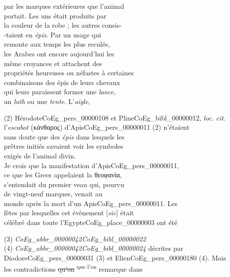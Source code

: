 \documentclass{book}
\begin{document}
{\begin{paracol}{2}
par les marques extérieures que l’animal\\
portait. Les uns était produits par\\
la couleur de la robe ; les autres consis-\\
-taient en \textit{épis}. Par un usage qui\\
remonte aux temps les plus reculés,\\
les Arabes ont encore aujourd’hui les\\
même croyances et attachent des\\
propriétés heureuses ou néfastes à certaines\\
combinaisons des épis de leurs chevaux\\
qui leurs paraissent former une \textit{lance},\\
un \textit{luth} ou une \textit{tente}. L’\textit{aigle},
\end{paracol}
\begin{paracol}{2}
\noindent (2) Hérodote\gls{CoEg_pers_00000108} et Pline\gls{CoEg_bibl_00000012}, \textit{loc. cit.}
\switchcolumn
\noindent l’\textit{escabot} (κάνθαρος) d’Apis\gls{CoEg_pers_00000011} (2) n’étaient\\
sans doute que des \textit{épis} dans lesquels les\\
prêtres initiés savaient voir les symboles\\
exigés de l’animal divin.\\
\indent Je crois que la manifestation d’Apis\gls{CoEg_pers_00000011},\\
ce que les Grecs appelaient la θεοφανία,\\
s’entendait du premier veau qui, pourvu\\
de vingt-neuf marques, venait au\\
monde après la mort d’un Apis\gls{CoEg_pers_00000011}. Les\\
fêtes par lesquelles cet évènement [\textit{sic}] était\\
célébré dans toute l’Egypte\gls{CoEg_place_00000003} ont été
\end{paracol}
\begin{paracol}{2}
\noindent (3) \textit{\Gls{CoEg_abbr_00000042}\gls{CoEg_bibl_00000022}}\\
(4) \textit{\Gls{CoEg_abbr_00000042}\gls{CoEg_bibl_00000024}}
\switchcolumn
\noindent 
décrites par Diodore\gls{CoEg_pers_00000031} (3) et Elien\gls{CoEg_pers_00000180} (4). Mais\\
les contradictions \sout{qu’on} \textsuperscript{que l’on} remarque dans\\

\end{paracol}}
\end{document}
